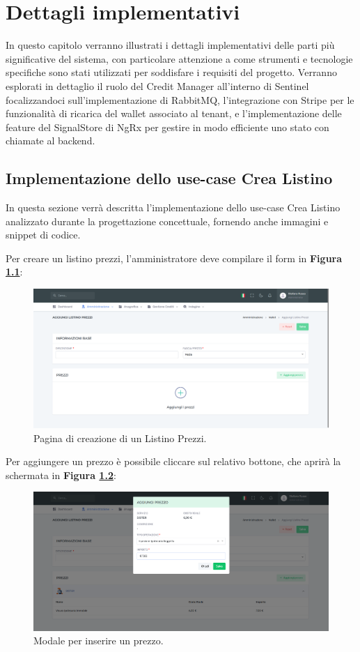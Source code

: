 \chapter{Dettagli implementativi}
In questo capitolo verranno illustrati i dettagli implementativi delle parti pi\`u significative del sistema, con particolare attenzione a come strumenti
e tecnologie specifiche sono stati utilizzati per soddisfare i requisiti del progetto. Verranno esplorati in dettaglio il ruolo del Credit Manager all'interno di Sentinel
focalizzandoci sull'implementazione di RabbitMQ, l'integrazione con Stripe per le funzionalit\`a di ricarica del wallet associato al tenant, e l'implementazione delle feature del
SignalStore di NgRx per gestire in modo efficiente uno stato con chiamate al backend.

\section{Implementazione dello use-case Crea Listino\label{crealistinosection}}
In questa sezione verr\`a descritta l'implementazione dello use-case Crea Listino analizzato durante la progettazione concettuale, fornendo anche immagini e snippet di codice.

Per creare un listino prezzi, l'amministratore deve compilare il form in \textbf{Figura \ref{createlistinoform}}:
\begin{figure}[H]
  \centering
  \includegraphics[width=13cm]{images/gestione-listini/screen/add-listino.png}
  \caption{Pagina di creazione di un Listino Prezzi.}
  \label{createlistinoform}
\end{figure}

Per aggiungere un prezzo \`e possibile cliccare sul relativo bottone, che aprir\`a la schermata in \textbf{Figura \ref{addpricemodal}}:
\begin{figure}[H]
  \centering
  \includegraphics[width=13cm]{images/gestione-listini/screen/add-prezzo-modal.png}
  \caption{Modale per inserire un prezzo.}
  \label{addpricemodal}
\end{figure}

